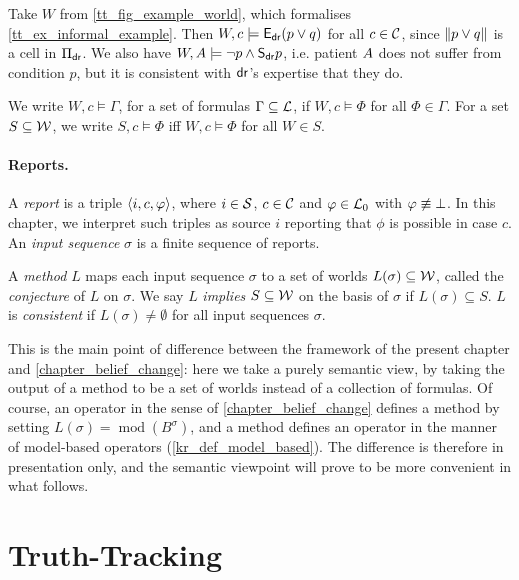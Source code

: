 \begin{example}
    \label{tt_ex_semantics}
    Take $W$ from \cref{tt_fig_example_world}, which formalises
    \cref{tt_ex_informal_example}. Then $W, c \models \mathsf{E}_{\mathsf{dr}{}}(p \lor q)$ for
    all $c \in \mathcal{C}$, since $\|{p \lor q}\|$ is a cell in $\Pi_{\mathsf{dr}{}}$.
    We also have $W, A{} \models \neg{p} \land \mathsf{S}_{\mathsf{dr}{}}p$, i.e.
    patient $A{}$ does not suffer from condition $p$, but it is
    consistent with $\mathsf{dr}{}$'s expertise that they do.
\end{example}

We write $W, c \models \Gamma$, for a set of formulas $\Gamma \subseteq \mathcal{L}$, if
$W, c \models \Phi$ for all $\Phi \in \Gamma$. For a set $S \subseteq \mathcal{W}$,
we write $S, c \models \Phi$ iff $W, c \models \Phi$ for all $W \in S$.

\paragraph{Reports.}

A \emph{report} is a triple $\langle {i, c, \varphi} \rangle$, where $i \in \mathcal{S}$, $c \in
\mathcal{C}$ and $\varphi \in \mathcal{L}_0$ with $\varphi \not\equiv \bot$. In this chapter, we
interpret such triples as source $i$ reporting that $\phi$ is possible in case
$c$. An \emph{input sequence} $\sigma$ is a finite sequence of reports.

A \emph{method} $L$ maps each input sequence $\sigma$ to a set of worlds
$L(\sigma) \subseteq \mathcal{W}$, called the \emph{conjecture} of $L$ on $\sigma$.
We say $L$ \emph{implies} $S \subseteq \mathcal{W}$ on the basis of $\sigma$ if
$L(\sigma) \subseteq S$. $L$ is \emph{consistent} if $L(\sigma) \ne \emptyset$
for all input sequences $\sigma$.

This is the main point of difference between the framework of the present
chapter and \cref{chapter_belief_change}: here we take a purely semantic view,
by taking the output of a method to be a set of worlds instead of a collection
of formulas. Of course, an operator in the sense of
\cref{chapter_belief_change} defines a method by setting $L(\sigma) =
\operatorname{mod}(B^\sigma)$, and a method defines an operator in the manner
of model-based operators (\cref{kr_def_model_based}). The difference is
therefore in presentation only, and the semantic viewpoint will prove to be
more convenient in what follows.

\section{Truth-Tracking}
\label{tt_sec_truthtracking}

